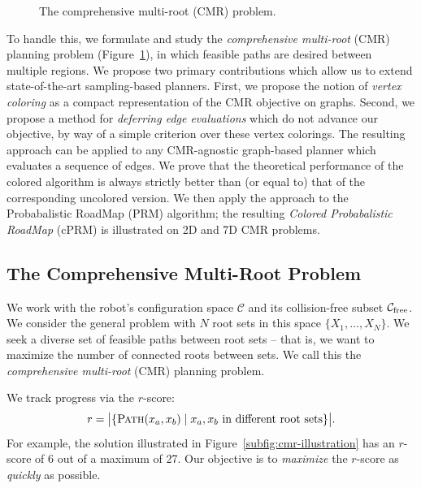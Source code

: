 \begin{figure}
{{
      }
      \label{subfig:cmr-illustration}
   }
   \caption{The comprehensive multi-root (CMR) problem.}
   \label{fig:cmr-problems}
\end{figure}

To handle this,
we formulate and study the
\emph{comprehensive multi-root} (CMR) planning problem
\cite{dellin2015cmr} (Figure~\ref{fig:cmr-problems}),
in which feasible paths are desired between multiple regions.
We propose two primary contributions which allow us to extend
state-of-the-art sampling-based planners.
First, we propose the notion of \emph{vertex coloring} as a compact
representation of the CMR objective on graphs.
Second, we propose a method for \emph{deferring edge evaluations}
which do not advance our objective, by way of a simple
criterion over these vertex colorings.
The resulting approach can be applied to any CMR-agnostic 
graph-based planner which evaluates a sequence of edges.
We prove that the theoretical performance of the colored algorithm
is always strictly better than (or equal to)
that of the corresponding uncolored version.
We then apply the approach to the Probabalistic RoadMap (PRM)
algorithm;
the resulting \emph{Colored Probabalistic RoadMap} (cPRM)
is illustrated on 2D and 7D CMR problems.

\subsection{The Comprehensive Multi-Root Problem}

We work with the robot's configuration space $\mathcal{C}$
and its collision-free subset $\mathcal{C}_{\mbox{\scriptsize free}}$.
We consider the general problem with $N$ root sets in this space
$\{ X_1, \dots, X_N \}$.
We seek a diverse set of feasible paths between root sets
-- that is, we want to maximize the number of connected roots between sets. 
We call this the \emph{comprehensive multi-root} (CMR) planning problem.

We track progress via the $r$-score:
\begin{equation}
   r = \big| \{
      \textsc{Path}(x_a,x_b) \;|\; x_a,x_b~\text{in different root sets}
      \} \big|.
   \label{eqn:obj}
\end{equation}
For example, the solution illustrated in Figure~\ref{subfig:cmr-illustration}
has an $r$-score of 6 out of a maximum of 27.
Our objective is to \emph{maximize} the $r$-score as \emph{quickly} as
possible.

